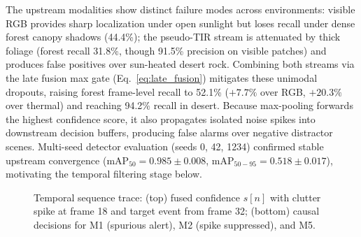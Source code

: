 \documentclass[conference]{IEEEtran}
\begin{document}
The upstream modalities show distinct failure modes across environments: visible RGB provides sharp localization under open sunlight but loses recall under dense forest canopy shadows (44.4\%); the pseudo-TIR stream is attenuated by thick foliage (forest recall 31.8\%, though 91.5\% precision on visible patches) and produces false positives over sun-heated desert rock. Combining both streams via the late fusion max gate (Eq.~\eqref{eq:late_fusion}) mitigates these unimodal dropouts, raising forest frame-level recall to 52.1\% ($+7.7\%$ over RGB, $+20.3\%$ over thermal) and reaching 94.2\% recall in desert. Because max-pooling forwards the highest confidence score, it also propagates isolated noise spikes into downstream decision buffers, producing false alarms over negative distractor scenes. Multi-seed detector evaluation (seeds 0, 42, 1234) confirmed stable upstream convergence ($\text{mAP}_{50} = 0.985 \pm 0.008$, $\text{mAP}_{50-95} = 0.518 \pm 0.017$), motivating the temporal filtering stage below.

\begin{figure}[!t]
\centering
\resizebox{0.80\columnwidth}{!}{}
\caption{Temporal sequence trace: (top) fused confidence $s[n]$ with clutter spike at frame 18 and target event from frame 32; (bottom) causal decisions for M1 (spurious alert), M2 (spike suppressed), and M5.}
\label{fig:real_temporal_sequence}
\end{figure}
\end{document}
